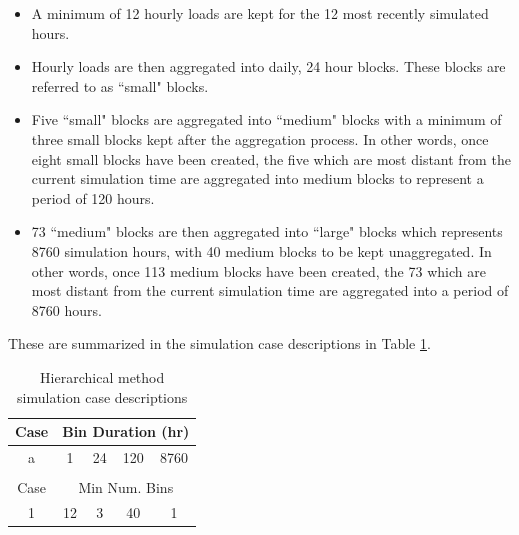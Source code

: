 \documentclass[review,12pt]{elsarticle}
\begin{document}
\begin{itemize}
    \item A minimum of 12 hourly loads are kept for the 12 most recently simulated hours.

    \item Hourly loads are then aggregated into daily, 24 hour blocks. These blocks are referred to as ``small" blocks.

    \item Five ``small" blocks are aggregated into ``medium" blocks with a minimum of three small blocks kept after the aggregation process. In other words, once eight small blocks have been created, the five which are most distant from the current simulation time are aggregated into medium blocks to represent a period of 120 hours.
    
    \item 73 ``medium" blocks are then aggregated into ``large" blocks which represents 8760 simulation hours, with 40 medium blocks to be kept unaggregated. In other words, once 113 medium blocks have been created, the 73 which are most distant from the current simulation time are aggregated into a period of 8760 hours.
    
\end{itemize}

These are summarized in the simulation case descriptions in Table \ref{tab: hierarchical cases}.

\begin{table}[htbp!]
\centering
\caption{Hierarchical method simulation case descriptions}
\label{tab: hierarchical cases}
\begin{tabular}{ccccc}
Case                    & \multicolumn{4}{c}{Bin Duration (hr)}                                                                    \\ \hline
\multicolumn{1}{|c|}{a} & \multicolumn{1}{c|}{1}  & \multicolumn{1}{c|}{24} & \multicolumn{1}{c|}{120} & \multicolumn{1}{c|}{8760} \\ \hline
                        &                         &                         &                          &                           \\
Case                    & \multicolumn{4}{c}{Min Num. Bins}                                                                        \\ \hline
\multicolumn{1}{|c|}{1} & \multicolumn{1}{c|}{12} & \multicolumn{1}{c|}{3}  & \multicolumn{1}{c|}{40}  & \multicolumn{1}{c|}{1}    \\ \hline
\end{tabular}
\end{table}
\end{document}
